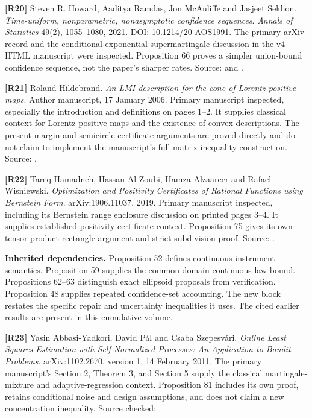\documentclass[11pt,oneside,openany]{book}
\numberwithin{equation}{section}
\begin{document}
\textbf{{[}R20{]}} Steven R. Howard, Aaditya Ramdas, Jon McAuliffe and
Jasjeet Sekhon. \emph{Time-uniform, nonparametric, nonasymptotic
confidence sequences}. \emph{Annals of Statistics} 49(2), 1055--1080,
2021. DOI: 10.1214/20-AOS1991. The primary arXiv record and the
conditional exponential-supermartingale discussion in the v4 HTML
manuscript were inspected. Proposition 66 proves a simpler union-bound
confidence sequence, not the paper's sharper rates. Source:
 and
.

\textbf{{[}R21{]}} Roland Hildebrand. \emph{An LMI description for the
cone of Lorentz-positive maps}. Author manuscript, 17 January 2006.
Primary manuscript inspected, especially the introduction and
definitions on pages 1--2. It supplies classical context for
Lorentz-positive maps and the existence of convex descriptions. The
present margin and semicircle certificate arguments are proved directly
and do not claim to implement the manuscript's full matrix-inequality
construction. Source:
.

\textbf{{[}R22{]}} Tareq Hamadneh, Hassan Al-Zoubi, Hamza Alzaareer and
Rafael Wisniewski. \emph{Optimization and Positivity Certificates of
Rational Functions using Bernstein Form}. arXiv:1906.11037, 2019.
Primary manuscript inspected, including its Bernstein range enclosure
discussion on printed pages 3--4. It supplies established
positivity-certificate context. Proposition 75 gives its own
tensor-product rectangle argument and strict-subdivision proof. Source:
.

\textbf{Inherited dependencies.} Proposition 52 defines continuous
instrument semantics. Proposition 59 supplies the common-domain
continuous-law bound. Propositions 62--63 distinguish exact ellipsoid
proposals from verification. Proposition 48 supplies repeated
confidence-set accounting. The new block restates the specific repair
and uncertainty inequalities it uses. The cited earlier results are
present in this cumulative volume.

\textbf{{[}R23{]}} Yasin Abbasi-Yadkori, David Pál and Csaba Szepesvári.
\emph{Online Least Squares Estimation with Self-Normalized Processes: An
Application to Bandit Problems}. arXiv:1102.2670, version 1, 14 February
2011. The primary manuscript's Section 2, Theorem 3, and Section 5
supply the classical martingale-mixture and adaptive-regression context.
Proposition 81 includes its own proof, retains conditional noise and
design assumptions, and does not claim a new concentration inequality.
Source checked: .
\end{document}
